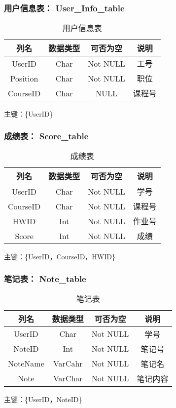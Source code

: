 \subsubsection{用户信息表： User\_Info\_table}

\begin{table}[htbp]
\centering
\caption{用户信息表} \label{tab:classification}
\begin{tabular}{|c|c|c|c|}
    \hline
    列名 & 数据类型 & 可否为空 & 说明 \\
	\hline
    UserID & Char & Not NULL & 工号 \\
    \hline
    Position & Char & Not NULL & 职位 \\
    \hline
    CourseID & Char & NULL & 课程号 \\
    \hline
\end{tabular}
\end{table}
主键：\{UserID\}


\subsubsection{成绩表： Score\_table}

\begin{table}[htbp]
\centering
\caption{成绩表} \label{tab:classification}
\begin{tabular}{|c|c|c|c|}
    \hline
    列名 & 数据类型 & 可否为空 & 说明 \\
	\hline
    UserID & Char & Not NULL & 学号 \\
    \hline
    CourseID & Char & Not NULL & 课程号 \\
    \hline
    HWID & Int & Not NULL & 作业号 \\
    \hline
    Score & Int & Not NULL & 成绩 \\
    \hline
\end{tabular}
\end{table}
主键：\{UserID，CourseID，HWID\}


\subsubsection{笔记表： Note\_table}

\begin{table}[htbp]
\centering
\caption{笔记表} \label{tab:classification}
\begin{tabular}{|c|c|c|c|}
    \hline
    列名 & 数据类型 & 可否为空 & 说明 \\
	\hline
    UserID & Char & Not NULL & 学号 \\
    \hline
    NoteID & Int & Not NULL & 笔记号 \\
    \hline
    NoteName & VarCahr & Not NULL & 笔记名 \\
    \hline
    Note & VarChar & Not NULL & 笔记内容 \\
    \hline
\end{tabular}
\end{table}
主键：\{UserID，NoteID\}



